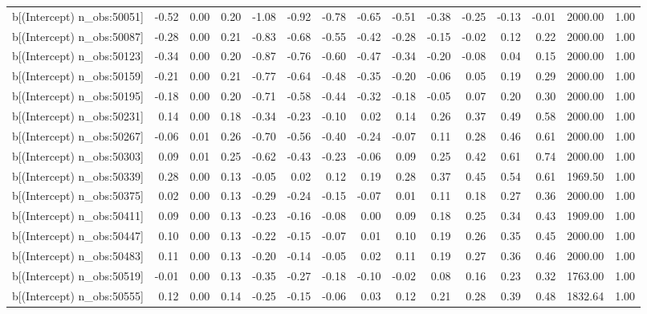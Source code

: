 \begin{table}[ht]
\begin{tabular}{rrrrrrrrrrrrrrr}
  b[(Intercept) n\_obs:50051] & -0.52 & 0.00 & 0.20 & -1.08 & -0.92 & -0.78 & -0.65 & -0.51 & -0.38 & -0.25 & -0.13 & -0.01 & 2000.00 & 1.00 \\ 
  b[(Intercept) n\_obs:50087] & -0.28 & 0.00 & 0.21 & -0.83 & -0.68 & -0.55 & -0.42 & -0.28 & -0.15 & -0.02 & 0.12 & 0.22 & 2000.00 & 1.00 \\ 
  b[(Intercept) n\_obs:50123] & -0.34 & 0.00 & 0.20 & -0.87 & -0.76 & -0.60 & -0.47 & -0.34 & -0.20 & -0.08 & 0.04 & 0.15 & 2000.00 & 1.00 \\ 
  b[(Intercept) n\_obs:50159] & -0.21 & 0.00 & 0.21 & -0.77 & -0.64 & -0.48 & -0.35 & -0.20 & -0.06 & 0.05 & 0.19 & 0.29 & 2000.00 & 1.00 \\ 
  b[(Intercept) n\_obs:50195] & -0.18 & 0.00 & 0.20 & -0.71 & -0.58 & -0.44 & -0.32 & -0.18 & -0.05 & 0.07 & 0.20 & 0.30 & 2000.00 & 1.00 \\ 
  b[(Intercept) n\_obs:50231] & 0.14 & 0.00 & 0.18 & -0.34 & -0.23 & -0.10 & 0.02 & 0.14 & 0.26 & 0.37 & 0.49 & 0.58 & 2000.00 & 1.00 \\ 
  b[(Intercept) n\_obs:50267] & -0.06 & 0.01 & 0.26 & -0.70 & -0.56 & -0.40 & -0.24 & -0.07 & 0.11 & 0.28 & 0.46 & 0.61 & 2000.00 & 1.00 \\ 
  b[(Intercept) n\_obs:50303] & 0.09 & 0.01 & 0.25 & -0.62 & -0.43 & -0.23 & -0.06 & 0.09 & 0.25 & 0.42 & 0.61 & 0.74 & 2000.00 & 1.00 \\ 
  b[(Intercept) n\_obs:50339] & 0.28 & 0.00 & 0.13 & -0.05 & 0.02 & 0.12 & 0.19 & 0.28 & 0.37 & 0.45 & 0.54 & 0.61 & 1969.50 & 1.00 \\ 
  b[(Intercept) n\_obs:50375] & 0.02 & 0.00 & 0.13 & -0.29 & -0.24 & -0.15 & -0.07 & 0.01 & 0.11 & 0.18 & 0.27 & 0.36 & 2000.00 & 1.00 \\ 
  b[(Intercept) n\_obs:50411] & 0.09 & 0.00 & 0.13 & -0.23 & -0.16 & -0.08 & 0.00 & 0.09 & 0.18 & 0.25 & 0.34 & 0.43 & 1909.00 & 1.00 \\ 
  b[(Intercept) n\_obs:50447] & 0.10 & 0.00 & 0.13 & -0.22 & -0.15 & -0.07 & 0.01 & 0.10 & 0.19 & 0.26 & 0.35 & 0.45 & 2000.00 & 1.00 \\ 
  b[(Intercept) n\_obs:50483] & 0.11 & 0.00 & 0.13 & -0.20 & -0.14 & -0.05 & 0.02 & 0.11 & 0.19 & 0.27 & 0.36 & 0.46 & 2000.00 & 1.00 \\ 
  b[(Intercept) n\_obs:50519] & -0.01 & 0.00 & 0.13 & -0.35 & -0.27 & -0.18 & -0.10 & -0.02 & 0.08 & 0.16 & 0.23 & 0.32 & 1763.00 & 1.00 \\ 
  b[(Intercept) n\_obs:50555] & 0.12 & 0.00 & 0.14 & -0.25 & -0.15 & -0.06 & 0.03 & 0.12 & 0.21 & 0.28 & 0.39 & 0.48 & 1832.64 & 1.00 \\ 

\end{tabular}
\end{table}
